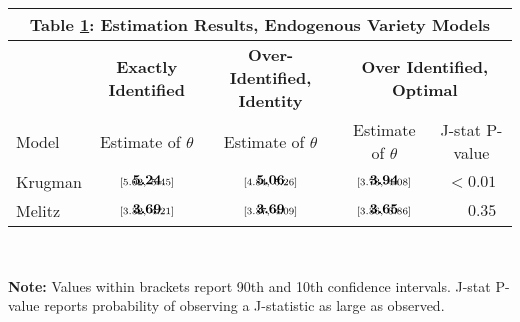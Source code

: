 \documentclass[12pt,dvips, ps2pdf]{article}
\renewcommand{\arraystretch}{1.1}
\begin{document}
\begin{table}[!h]
\footnotesize
{}
\renewcommand{\arraystretch}{2}
\setlength {\tabcolsep}{1.75mm}
\begin{center}\label{tb:melitz_rslts}
\begin{tabular}[t]{l c c c c }
\multicolumn{5}{c}{\normalsize\textbf{Table \ref{tb:melitz_rslts}: Estimation Results, Endogenous Variety Models}}
\\
\hline
\hline
& \textbf{Exactly Identified} & \textbf{Over-Identified, Identity} & \multicolumn{2}{c}{\textbf{Over Identified, Optimal}} \\
\cmidrule(r){2-2}  \cmidrule(lr){3-3} \cmidrule(lr){4-5}
Model &  Estimate of $\theta$ & Estimate of $ \theta$ & Estimate of $\theta$ & J-stat P-value \\
\hline
Krugman & $\begin{array}{c}{\textbf{5.24}} \vspace{-.4cm}\\ \scriptstyle{[5.02,   \ 5.45]}\end{array}$  & $\begin{array}{c}{\textbf{5.06}} \vspace{-.4cm}\\ \scriptstyle{[4.84,   \ 5.26]}\end{array}$ & $\begin{array}{c}{\textbf{3.94}} \vspace{-.4cm}\\ \scriptstyle{[3.73,   \ 4.08]}\end{array}$ & $< 0.01$ \\
Melitz& $\begin{array}{c}{\textbf{3.69}} \vspace{-.4cm}\\ \scriptstyle{[3.32,   \ 4.21]}\end{array}$ &  $\begin{array}{c}{\textbf{3.69}} \vspace{-.4cm}\\ \scriptstyle{[3.37,   \ 4.09]}\end{array}$   &  $\begin{array}{c}{\textbf{3.65}} \vspace{-.4cm}\\ \scriptstyle{[3.36,   \ 3.86]}\end{array}$  & $\phantom{<} 0.35$          \\
\hline
\end{tabular}
\\[0.75ex]
\parbox{5.7in}{\footnotesize \textbf{Note:}  Values within brackets report 90th and 10th confidence intervals. J-stat P-value reports probability of observing a J-statistic as large as observed.}
\end{center}
\end{table}
\end{document}
